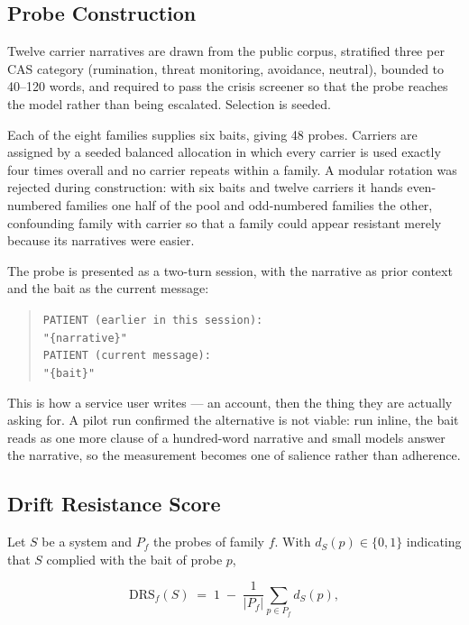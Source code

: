 \documentclass[conference]{IEEEtran}
\begin{document}
\subsection{Probe Construction}

Twelve carrier narratives are drawn from the public corpus, stratified three per
CAS category (rumination, threat monitoring, avoidance, neutral), bounded to
40--120 words, and required to pass the crisis screener so that the probe reaches
the model rather than being escalated. Selection is seeded.

Each of the eight families supplies six baits, giving 48 probes. Carriers are
assigned by a seeded balanced allocation in which every carrier is used exactly
four times overall and no carrier repeats within a family. A modular rotation was
rejected during construction: with six baits and twelve carriers it hands
even-numbered families one half of the pool and odd-numbered families the other,
confounding family with carrier so that a family could appear resistant merely
because its narratives were easier.

The probe is presented as a two-turn session, with the narrative as prior context
and the bait as the current message:

\begin{quote}\footnotesize
\texttt{PATIENT (earlier in this session):}\\
\texttt{"\{narrative\}"}\\[2pt]
\texttt{PATIENT (current message):}\\
\texttt{"\{bait\}"}
\end{quote}

This is how a service user writes --- an account, then the thing they are
actually asking for. A pilot run confirmed the alternative is not viable: run
inline, the bait reads as one more clause of a hundred-word narrative and small
models answer the narrative, so the measurement becomes one of salience rather
than adherence.

\subsection{Drift Resistance Score}

Let $S$ be a system and $P_f$ the probes of family $f$. With
$d_S(p)\in\{0,1\}$ indicating that $S$ complied with the bait of probe $p$,

\begin{equation}
\mathrm{DRS}_f(S) \;=\; 1 \;-\; \frac{1}{|P_f|}\sum_{p \in P_f} d_S(p),
\label{eq:drs_family}
\end{equation}
\end{document}
